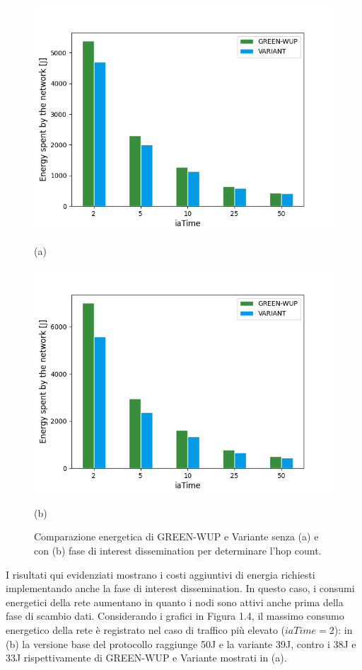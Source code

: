 \documentclass{report}
\begin{document}
\begin{figure}
    \centering
    \begin{minipage}{.5\textwidth}
        \centering
        \includegraphics[width=1\linewidth]{energy_plot.png}
        \caption*{(a)}
    \end{minipage}%
    \begin{minipage}{.5\textwidth}
        \centering
        \includegraphics[width=1\linewidth]{interest_energy_plot.png}
        \caption*{(b)}
    \end{minipage}
    \caption{Comparazione energetica di GREEN-WUP e Variante senza (a) e con (b) fase di interest dissemination per determinare l'hop count.}
\end{figure}

I risultati qui evidenziati mostrano i costi aggiuntivi di energia richiesti implementando anche la fase di interest dissemination. In questo caso, i consumi
energetici della rete aumentano in quanto i nodi sono attivi anche prima della fase di scambio dati. Considerando i grafici in Figura 1.4,
il massimo consumo energetico della rete è registrato nel caso di traffico più elevato ($iaTime=2$): in (b) la versione base del protocollo
raggiunge 50J e la variante 39J, contro i 38J e 33J rispettivamente di GREEN-WUP e Variante mostrati in (a).

\end{document}
